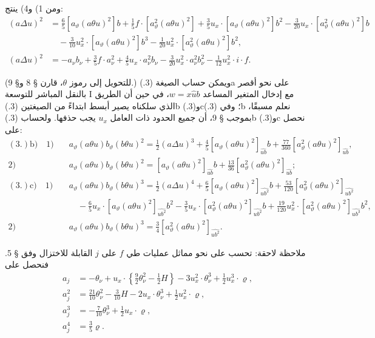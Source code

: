 \documentclass[11pt]{article}
\providecommand{\A}{\Delta}
\begin{document}
ومن 1) و4) ينتج:
\[
\begin{aligned}
(a\A u)^2
&=\frac65[a_\vartheta(a\theta u)^2]b+\frac15f\cdot[a_\vartheta^2(a\theta u)^2]+\frac35u_x\cdot[a_\vartheta(a\theta u)^2]b^2-\frac3{20}u_x\cdot[a_\vartheta^2(a\theta u)^2]b\\
&\quad-\frac3{10}u_x^2\cdot[a_\vartheta(a\theta u)^2]b^3-\frac1{20}u_x^2\cdot[a_\vartheta^2(a\theta u)^2]b^2,\\[0.4em]
(a\A u)^2&=-a_\nu b_\nu+\frac35f\cdot a_\nu^2+\frac45u_x\cdot a_\nu^2b_\nu-\frac3{20}u_x^2\cdot a_\nu^2b_\nu^2-\frac1{12}u_x^2\cdot i\cdot f.
\end{aligned}
\]

(للتحويل إلى رموز $\theta$، قارن § 8 و§ 9.)
ويمكن حساب الصيغة (3.)a على نحو أقصر بالنقل المباشر للتوسعة I مع إدخال المتغير المساعد $w=x\widehat{u}b$، في حين أن الطريق الذي سلكناه يصير أبسط ابتداءً من الصيغتين (3.)b و(3.)c؛ وفي (3.)b نعلم مسبقًا، بموجب § 9، أن جميع الحدود ذات العامل $u_x$ يجب حذفها. ولحساب (3.)b و(3.)c نحصل على:
\[
\begin{aligned}
(3.)\mathrm{b)}\quad 1)&\quad a_\vartheta(a\theta u)b_\vartheta(b\theta u)^2=\frac12(a\A u)^3+\frac45[a_\vartheta(a\theta u)^2]_{\widehat{ub}}b+\frac{77}{360}[a_\vartheta^2(a\theta u)^2]_{\widehat{ub}},\\
2)&\quad a_\vartheta(a\theta u)b_\vartheta(b\theta u)^2=[a_\vartheta(a\theta u)^2]_{\widehat{ub}}b+\frac{13}{36}[a_\vartheta^2(a\theta u)^2]_{\widehat{ub}};\\[0.5em]
(3.)\mathrm{c)}\quad 1)&\quad a_\vartheta(a\theta u)b_\vartheta(b\theta u)^3=\frac12(a\A u)^4+\frac65[a_\vartheta(a\theta u)^2]_{\widehat{ub^2}}b+\frac{53}{120}[a_\vartheta^2(a\theta u)^2]_{\widehat{ub^2}}\\
&\qquad-\frac65u_x\cdot[a_\vartheta(a\theta u)^2]_{\widehat{ub^2}}b^2-\frac35u_x\cdot[a_\vartheta^2(a\theta u)^2]_{\widehat{ub^2}}b+\frac{19}{120}u_x^2\cdot[a_\vartheta^2(a\theta u)^2]_{\widehat{ub^3}}b^2,\\
2)&\quad a_\vartheta(a\theta u)b_\vartheta(b\theta u)^3=\frac34[a_\vartheta^2(a\theta u)^2]_{\widehat{ub^2}}.
\end{aligned}
\]

ملاحظة لاحقة: تحسب على نحو مماثل عمليات طي $f$ على $j$ القابلة للاختزال وفق § 5. فنحصل على
\[
\tag{4.}
\begin{aligned}
a_j&=-\theta_\nu+u_x\cdot\left\{\frac92\theta_\nu^2-\frac12H\right\}-3u_x^2\cdot\theta_\nu^3+\frac12u_x^3\cdot\varrho,\\
a_j^2&=\frac{21}{10}\theta_\nu^2-\frac3{10}H-2u_x\cdot\theta_\nu^3+\frac12u_x^2\cdot\varrho,\\
a_j^3&=-\frac7{10}\theta_\nu^3+\frac12u_x\cdot\varrho,\\
a_j^4&=\frac35\varrho.
\end{aligned}
\]
\end{document}

